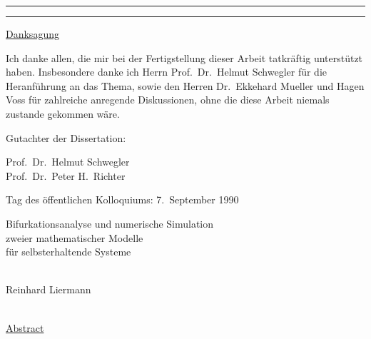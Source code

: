 %
%
%
  \maketitle
%
%
%
  \newpage
      \rule[0.0ex]{0.1ex}{0.0ex}
  \newpage
  \rule[0.0ex]{0.1ex}{0.0ex} \newline
  {\large \underline{Danksagung}    \rule[-2.0ex]{0.0ex}{0.1ex}
  {\em
  \newline
       \begin{minipage}{14cm}
            Ich danke allen, die mir bei der
            Fertigstellung dieser Arbeit
            tat\-kr\"af\-tig
            un\-ter\-st\"utzt
            haben.
            Insbesondere danke ich
            Herrn Prof.\ Dr.\ Helmut Schwegler
            f\"ur die Heran\-f\"uh\-rung an das Thema,
            sowie den Herren
            Dr.\ Ekkehard Mueller und Hagen Voss
            f\"ur  zahlreiche anregende  Diskussionen,
            ohne die diese  Arbeit
            niemals zustande gekommen w\"a\-re.
      \end{minipage}
  }
  }
  \newline
  \rule[0.0ex]{0.0ex}{13.5cm}
  \newline
  {\large
  Gutachter der Dissertation:
       \begin{minipage}[t]{7cm}
               Prof.\ Dr.\ Helmut Schwegler \\
               Prof.\ Dr.\ Peter H.\ Richter
      \end{minipage}
  \newline  \rule[0.0ex]{0.0ex}{2.0ex}
  \newline
  Tag des \"offentlichen Kolloquiums:
                7.\ September 1990
  }
  \newline
  \newpage
%
%
%
  \begin{center}
     {\large  Bifurkationsanalyse      und
         numerische Simulation \vspace{-0.5ex}   \\
         zweier       mathematischer Modelle  \\
         f\"ur      selbsterhaltende Systeme}
      \\       \rule[0.0ex]{0.0ex}{2ex}  \\
      Reinhard Liermann
      \\       \rule[0.0ex]{0.0ex}{5ex}  \\
      {\large \underline{Abstract}}   \rule[0.0ex]{0.0ex}{-1.0ex}
  \end{center}
